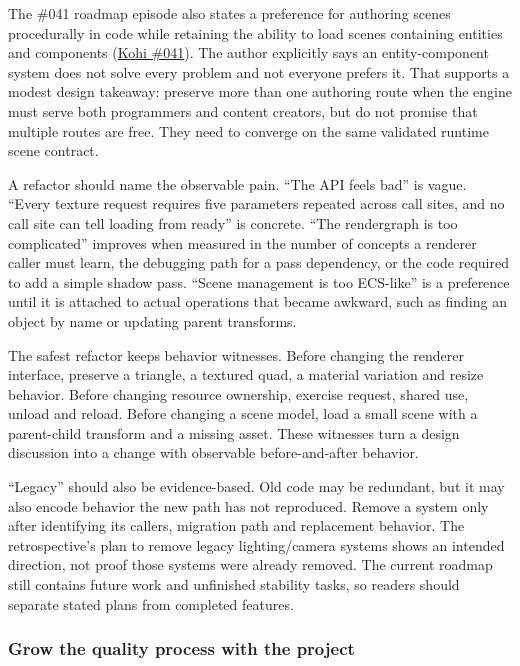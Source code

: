 The \#041 roadmap episode also states a preference for authoring scenes procedurally in code while retaining the ability to load scenes containing entities and components (\href{https://www.youtube.com/watch?v=SS8Zn13cZus}{Kohi \#041}). The author explicitly says an entity-component system does not solve every problem and not everyone prefers it. That supports a modest design takeaway: preserve more than one authoring route when the engine must serve both programmers and content creators, but do not promise that multiple routes are free. They need to converge on the same validated runtime scene contract.

A refactor should name the observable pain. ``The API feels bad'' is vague. ``Every texture request requires five parameters repeated across call sites, and no call site can tell loading from ready'' is concrete. ``The rendergraph is too complicated'' improves when measured in the number of concepts a renderer caller must learn, the debugging path for a pass dependency, or the code required to add a simple shadow pass. ``Scene management is too ECS-like'' is a preference until it is attached to actual operations that became awkward, such as finding an object by name or updating parent transforms.

The safest refactor keeps behavior witnesses. Before changing the renderer interface, preserve a triangle, a textured quad, a material variation and resize behavior. Before changing resource ownership, exercise request, shared use, unload and reload. Before changing a scene model, load a small scene with a parent-child transform and a missing asset. These witnesses turn a design discussion into a change with observable before-and-after behavior.

``Legacy'' should also be evidence-based. Old code may be redundant, but it may also encode behavior the new path has not reproduced. Remove a system only after identifying its callers, migration path and replacement behavior. The retrospective's plan to remove legacy lighting/camera systems shows an intended direction, not proof those systems were already removed. The current roadmap still contains future work and unfinished stability tasks, so readers should separate stated plans from completed features.

\subsubsection{Grow the quality process with the project}\label{06-engine-ii-ch041-grow-the-quality-process-with-the-project}

